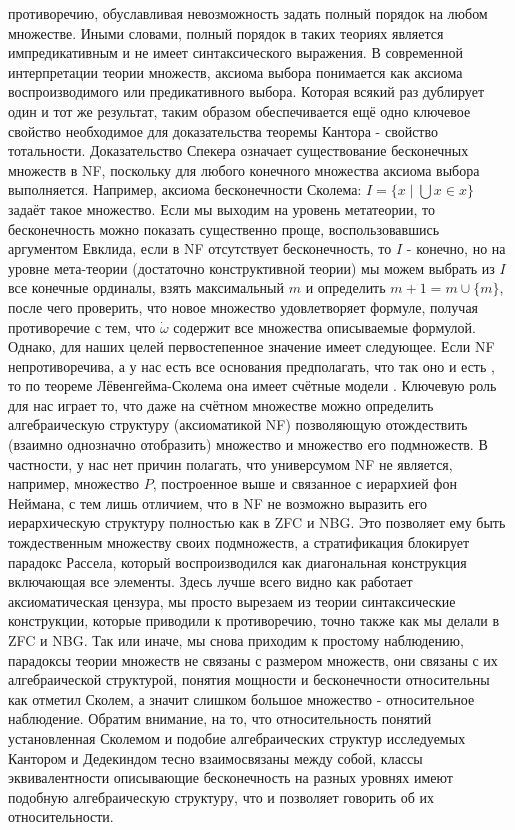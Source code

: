 \documentclass[12pt]{article}
\begin{document}
противоречию, обуславливая невозможность задать полный порядок на любом множестве. Иными словами, полный порядок в таких теориях является импредикативным и не имеет синтаксического выражения. В современной интерпретации теории множеств, аксиома выбора понимается как аксиома воспроизводимого или предикативного выбора. Которая всякий раз дублирует один и тот же результат, таким образом обеспечивается ещё одно ключевое свойство необходимое для доказательства теоремы Кантора - свойство тотальности. Доказательство Спекера означает существование бесконечных множеств в NF, поскольку для любого конечного множества аксиома выбора выполняется. Например, аксиома бесконечности Сколема: $I = \{ x \mid \bigcup x \in x \}$ задаёт такое множество. Если мы выходим на уровень метатеории, то бесконечность можно показать существенно проще, воспользовавшись аргументом Евклида, если в NF отсутствует бесконечность, то $I$ - конечно, но на уровне мета-теории (достаточно конструктивной теории) мы можем выбрать из $I$ все конечные ординалы, взять максимальный $m$ и определить $m + 1 = m \cup \{ m \}$, после чего проверить, что новое множество удовлетворяет формуле, получая противоречие с тем, что $\dot{\omega}$ содержит все множества описываемые формулой. Однако, для наших целей первостепенное значение имеет следующее. Если NF непротиворечива, а у нас есть все основания предполагать, что так оно и есть \cite{holmes-nf-consistent}, то по теореме Лёвенгейма-Сколема она имеет счётные модели \cite{skolem-set-theory}. Ключевую роль для нас играет то, что даже на счётном множестве можно определить алгебраическую структуру (аксиоматикой NF) позволяющую отождествить (взаимно однозначно отобразить) множество и множество его подмножеств. В частности, у нас нет причин полагать, что универсумом NF не является, например, множество $P$, построенное выше и связанное с иерархией фон Неймана, с тем лишь отличием, что в NF не возможно выразить его иерархическую структуру полностью как в ZFC и NBG. Это позволяет ему быть тождественным множеству своих подмножеств, а стратификация блокирует парадокс Рассела, который воспроизводился как диагональная конструкция включающая все элементы. Здесь лучше всего видно как работает аксиоматическая цензура, мы просто вырезаем из теории синтаксические конструкции, которые приводили к противоречию, точно также как мы делали в ZFC и NBG. Так или иначе, мы снова приходим к простому наблюдению, парадоксы теории множеств не связаны с размером множеств, они связаны с их алгебраической структурой, понятия мощности и бесконечности относительны как отметил Сколем, а значит слишком большое множество - относительное наблюдение. Обратим внимание, на то, что относительность понятий установленная Сколемом и подобие алгебраических структур исследуемых Кантором и Дедекиндом тесно взаимосвязаны между собой, классы эквивалентности описывающие бесконечность на разных уровнях имеют подобную алгебраическую структуру, что и позволяет говорить об их относительности.
\end{document}
